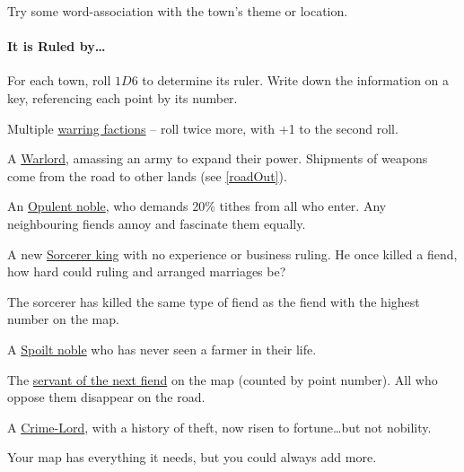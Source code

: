 \begin{multicols}{2}
Try some word-association with the town's theme or location.

\paragraph{It is Ruled by\ldots{}}

For each town, roll $1D6$ to determine its ruler.
Write down the information on a key, referencing each point by its number.

\begin{dlist}
  \item
  Multiple \underline{warring factions} -- roll twice more, with +1 to the second roll.
  \item
  A \underline{Warlord}, amassing an army to expand their power.
  Shipments of weapons come from the road to other lands
  (see \vref{roadOut}).
  \item
  An \underline{Opulent noble}, who demands 20\% tithes from all who enter.
  Any neighbouring fiends annoy and fascinate them equally.
  \item
  A new \underline{Sorcerer king} with no experience or business ruling.
  He once killed a fiend, how hard could ruling  and arranged marriages be?

  The sorcerer has killed the same type of fiend as the fiend with the highest number on the map.
  \item
  A \underline{Spoilt noble} who has never seen a farmer in their life.
  \item
  The \underline{servant of the next fiend} on the map (counted by point number).
  All who oppose them disappear on the road.
  \item
  A \underline{Crime-Lord}, with a history of theft, now risen to fortune\ldots but not nobility.
\end{dlist}


Your map has everything it needs, but you could always add more.


\end{multicols}
